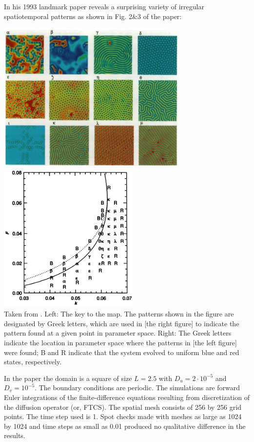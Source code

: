 In his 1993 landmark paper \textcite{pear93} reveals a surprising variety of 
irregular spatiotemporal patterns as shown in Fig. 2\&3 of the paper:

\begin{center}
\includegraphics[height=7.5cm]{python_codes/fieldstone_171/images/pear93a}
\includegraphics[height=7.5cm]{python_codes/fieldstone_171/images/pear93b}\\
{\captionfont Taken from \cite{pear93}. Left: The key to the map. The patterns 
shown in the figure are designated by Greek letters, which are used in 
[the right figure] to indicate the pattern found at a given point in parameter space.
Right: The Greek letters indicate the location in parameter
space where the patterns in [the left figure] were found; B and R indicate that
the system evolved to uniform blue and red states, respectively.
} 
\end{center}

In the paper the domain is a square of size $L=2.5$ with $D_u=2\cdot 10^{-5}$
and $D_v=10^{-5}$. The boundary conditions are periodic.
The simulations are forward Euler integrations of the finite-difference equations 
resulting from discretization of the diffusion operator (or, FTCS). 
The spatial mesh consists of 256 by 256
grid points. The time step used is 1. Spot checks made with meshes as large as 1024 by
1024 and time steps as small as 0.01 produced no qualitative difference in the results.

